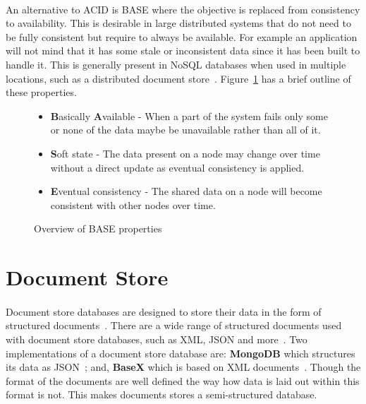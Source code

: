\documentclass{CRPITStyle}
\renewcommand{\cite}{\citep}
\begin{document}

\paragraph{}
An alternative to ACID is BASE where the objective is replaced from consistency
to availability.
This is desirable in large distributed systems that do not need to be
fully consistent but require to always be available.
For example an application will not mind that it has some stale or
inconsistent data since it has been built to handle it.
This is generally present in NoSQL databases when used in multiple
locations, such as a distributed document store~\cite{base}.
Figure~\ref{l:base} has a brief outline of these properties.

\begin{figure}
\begin{itemize}
    \item \textbf{B}asically \textbf{A}vailable - When a part of the system
        fails only some or none of the data maybe be unavailable rather than
        all of it.
    \item \textbf{S}oft state - The data present on a node may change over time
        without a direct update as eventual consistency is applied.
    \item \textbf{E}ventual consistency - The shared data on a node will become consistent with
        other nodes over time.
\end{itemize}
\caption{Overview of BASE properties~\cite{base}}\label{l:base}
\end{figure}





\section{Document Store}

\paragraph{}
Document store databases are designed to store their data in the form of
structured documents~\cite{base}.
There are a wide range of structured documents used with document store
databases, such as XML, JSON and more~\cite{base,compare_nosql}.
Two implementations of a document store database are: \textbf{MongoDB} which
structures its data as JSON~\cite{base}; and, \textbf{BaseX} which is based on XML
documents~\cite{basex}.
Though the format of the documents are well defined the 
way how data is laid out within this format is not.
This makes documents stores a semi-structured database.
\end{document}
